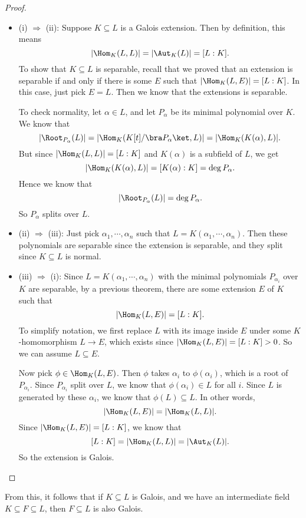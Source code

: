 \documentclass[a4paper]{article}
\begin{document}
\begin{proof}\leavevmode
  \begin{itemize}
    \item (i) $\Rightarrow$ (ii): Suppose $K\subseteq L$ is a Galois extension. Then by definition, this means
      \[
        |\Hom_K(L, L)| = |\Aut_K(L)| = [L:K].
      \]
      To show that $K\subseteq L$ is separable, recall that we proved that an extension is separable if and only if there is some $E$ such that $|\Hom_K(L, E)| = [L:K]$. In this case, just pick $E = L$. Then we know that the extensions is separable.

      To check normality, let $\alpha \in L$, and let $P_\alpha$ be its minimal polynomial over $K$. We know that
      \[
        |\Root_{P_\alpha}(L)| = |\Hom_K(K[t]/\bra P_\alpha\ket, L)| = |\Hom_K(K(\alpha), L)|.
      \]
      But since $|\Hom_K(L, L)| = [L:K]$ and $K(\alpha)$ is a subfield of $L$, we get
      \[
        |\Hom_K(K(\alpha), L)| = [K(\alpha): K] = \deg P_\alpha.
      \]
      Hence we know that
      \[
        |\Root_{P_\alpha}(L)| = \deg P_\alpha.
      \]
      So $P_\alpha$ splits over $L$.
    \item (ii) $\Rightarrow$ (iii): Just pick $\alpha_1, \cdots, \alpha_n$ such that $L = K(\alpha_1, \cdots, \alpha_n)$. Then these polynomials are separable since the extension is separable, and they split since $K\subseteq L$ is normal.

    \item (iii) $\Rightarrow$ (i):  Since $L = K(\alpha_1, \cdots, \alpha_n)$ with the minimal polynomials $P_{\alpha_i}$ over $K$ are separable, by a previous theorem, there are some extension $E$ of $K$ such that
      \[
        |\Hom_K(L, E)| = [L:K].
      \]
      To simplify notation, we first replace $L$ with its image inside $E$ under some $K$-homomorphism $L \to E$, which exists since $|\Hom_K(L, E)| = [L:K] > 0$. So we can assume $L\subseteq E$.

      Now pick $\phi \in \Hom_K(L, E)$. Then $\phi$ takes $\alpha_i$ to $\phi(\alpha_i)$, which is a root of $P_{\alpha_i}$. Since $P_{\alpha_i}$ split over $L$, we know that $\phi(\alpha_i) \in L$ for all $i$. Since $L$ is generated by these $\alpha_i$, we know that $\phi(L) \subseteq L$. In other words,
      \[
        |\Hom_K(L, E)| = |\Hom_K(L, L)|.
      \]
      Since $|\Hom_K(L, E)| = [L:K]$,  we know that
      \[
        [L:K] = |\Hom_K(L, L)| = |\Aut_K(L)|.
      \]
      So the extension is Galois.
  \end{itemize}
\end{proof}
From this, it follows that if $K\subseteq L$ is Galois, and we have an intermediate field $K\subseteq F \subseteq L$, then $F\subseteq L$ is also Galois.
\end{document}
